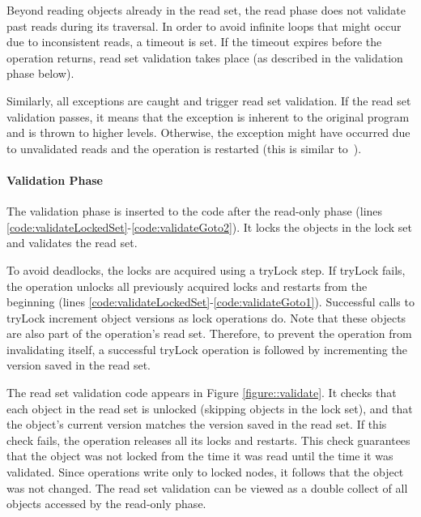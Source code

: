 Beyond reading objects already in the read set,
the read phase does not validate past reads during its traversal.  
In order to avoid infinite loops that might occur due to inconsistent reads, a timeout is set. 
If the timeout expires before the operation returns, read set 
validation takes place (as described in the validation phase below).

Similarly, all exceptions are caught and trigger read set validation. 
If the read set validation passes, it means that the exception is inherent
to the original program and is thrown to higher levels. Otherwise, the
exception might have occurred due to unvalidated reads and the operation is
restarted (this is similar to~\cite{Nakaike:2010}). 

  

\paragraph{Validation Phase} 
The validation phase is inserted to the code after
the read-only phase (lines
\ref{code:validateLockedSet}-\ref{code:validateGoto2}). 
It locks the objects in the lock set and validates the read set. 

To avoid deadlocks, the locks are acquired using a tryLock
step. If tryLock fails, the operation unlocks  all
previously acquired locks and restarts from the beginning 
(lines \ref{code:validateLockedSet}-\ref{code:validateGoto1}). 
Successful calls to tryLock increment object versions as lock operations do.
Note that these objects are also part of the 
operation's read set. Therefore, to prevent the operation from invalidating itself, 
a successful tryLock operation is followed by incrementing
the version saved in the read set.  

The read set validation code appears in Figure \ref{figure::validate}. 
It checks that each object in the read set is unlocked (skipping objects in the lock set), 
and that the object's current version matches the version saved in the 
read set. If this check fails, the operation releases all its
locks and restarts. This check guarantees
that the object was not locked from the time it was read until
the time it was validated. Since operations write only to
locked nodes, it follows that the object was not changed.  
The read set validation can be viewed as a double collect 
of all objects accessed by the read-only phase. 


